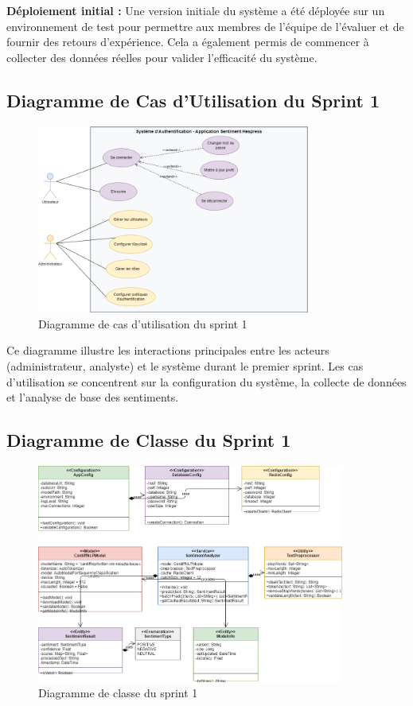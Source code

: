 \textbf{Déploiement initial :} Une version initiale du système a été déployée sur un environnement de test pour permettre aux membres de l'équipe de l'évaluer et de fournir des retours d'expérience. Cela a également permis de commencer à collecter des données réelles pour valider l'efficacité du système.

\subsection{Diagramme de Cas d'Utilisation du Sprint 1}

\begin{figure}[H]
\centering
\includegraphics[width=0.8\textwidth]{assets/images/auth-usecase.png} 
\caption{Diagramme de cas d'utilisation du sprint 1}
\label{fig:sprint1-usecase}
\end{figure}

Ce diagramme illustre les interactions principales entre les acteurs (administrateur, analyste) et le système durant le premier sprint. Les cas d'utilisation se concentrent sur la configuration du système, la collecte de données et l'analyse de base des sentiments.

\subsection{Diagramme de Classe du Sprint 1}

\begin{figure}[H]
\centering
\includegraphics[width=0.9\textwidth]{assets/images/sprint1-class.png}
\caption{Diagramme de classe du sprint 1}
\label{fig:sprint1-class}
\end{figure}

